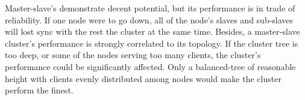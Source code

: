 Master-slave's demonstrate decent potential, but its performance is in trade of reliability. If one node were to go down, all of the node's slaves and sub-slaves will lost sync with the rest the cluster at the same time. Besides, a master-slave cluster's performance is strongly correlated to its topology. If the cluster tree is too deep, or some of the nodes serving too many clients, the cluster's performance could be significantly affected. Only a balanced-tree of reasonable height with clients evenly distributed among nodes would make the cluster perform the finest. 
